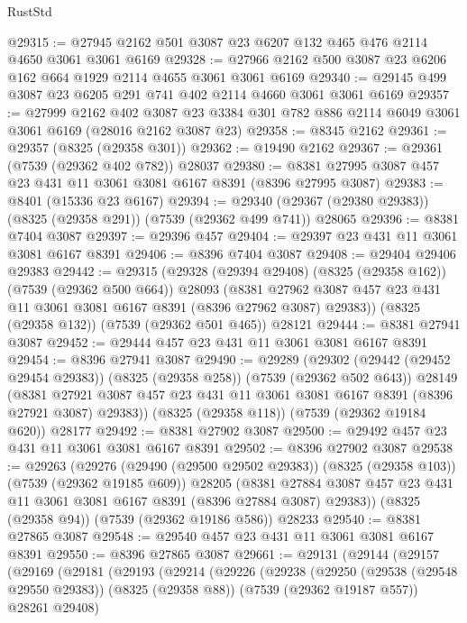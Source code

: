 \begin{lexlean}{RustStd}
\begin{coremodule}
@29315 := @27945 @2162 @501 @3087 @23 @6207 @132 @465 @476 @2114 @4650 @3061 @3061 @6169
@29328 := @27966 @2162 @500 @3087 @23 @6206 @162 @664 @1929 @2114 @4655 @3061 @3061 @6169
@29340 := @29145 @499 @3087 @23 @6205 @291 @741 @402 @2114 @4660 @3061 @3061 @6169
@29357 := @27999
    @2162
    @402
    @3087
    @23
    @3384
    @301
    @782
    @886
    @2114
    @6049
    @3061
    @3061
    @6169
    (@28016 @2162 @3087 @23)
@29358 := @8345 @2162
@29361 := @29357 (@8325 (@29358 @301))
@29362 := @19490 @2162
@29367 := @29361 (@7539 (@29362 @402 @782)) @28037
@29380 := @8381 @27995 @3087 @457 @23 @431 @11 @3061 @3081 @6167 @8391 (@8396 @27995 @3087)
@29383 := @8401 (@15336 @23 @6167)
@29394 := @29340 (@29367 (@29380 @29383)) (@8325 (@29358 @291)) (@7539 (@29362 @499 @741)) @28065
@29396 := @8381 @7404 @3087
@29397 := @29396 @457
@29404 := @29397 @23 @431 @11 @3061 @3081 @6167 @8391
@29406 := @8396 @7404 @3087
@29408 := @29404 @29406 @29383
@29442 := @29315
    (@29328
      (@29394 @29408)
      (@8325 (@29358 @162))
      (@7539 (@29362 @500 @664))
      @28093
      (@8381 @27962 @3087 @457 @23 @431 @11 @3061 @3081 @6167 @8391 (@8396 @27962 @3087) @29383))
    (@8325 (@29358 @132))
    (@7539 (@29362 @501 @465))
    @28121
@29444 := @8381 @27941 @3087
@29452 := @29444 @457 @23 @431 @11 @3061 @3081 @6167 @8391
@29454 := @8396 @27941 @3087
@29490 := @29289
    (@29302
      (@29442 (@29452 @29454 @29383))
      (@8325 (@29358 @258))
      (@7539 (@29362 @502 @643))
      @28149
      (@8381 @27921 @3087 @457 @23 @431 @11 @3061 @3081 @6167 @8391 (@8396 @27921 @3087) @29383))
    (@8325 (@29358 @118))
    (@7539 (@29362 @19184 @620))
    @28177
@29492 := @8381 @27902 @3087
@29500 := @29492 @457 @23 @431 @11 @3061 @3081 @6167 @8391
@29502 := @8396 @27902 @3087
@29538 := @29263
    (@29276
      (@29490 (@29500 @29502 @29383))
      (@8325 (@29358 @103))
      (@7539 (@29362 @19185 @609))
      @28205
      (@8381 @27884 @3087 @457 @23 @431 @11 @3061 @3081 @6167 @8391 (@8396 @27884 @3087) @29383))
    (@8325 (@29358 @94))
    (@7539 (@29362 @19186 @586))
    @28233
@29540 := @8381 @27865 @3087
@29548 := @29540 @457 @23 @431 @11 @3061 @3081 @6167 @8391
@29550 := @8396 @27865 @3087
@29661 := @29131
    (@29144
      (@29157
        (@29169
          (@29181
            (@29193
              (@29214
                (@29226
                  (@29238
                    (@29250
                      (@29538 (@29548 @29550 @29383))
                      (@8325 (@29358 @88))
                      (@7539 (@29362 @19187 @557))
                      @28261
                      @29408)

\end{coremodule}
\end{lexlean}
